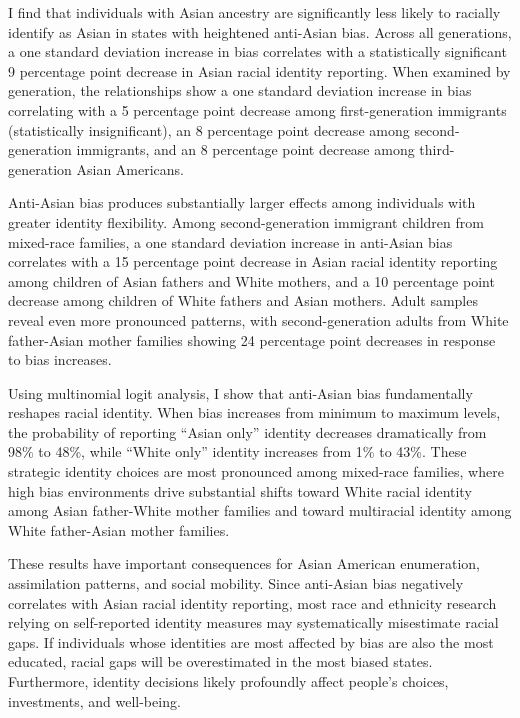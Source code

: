 I find that individuals with Asian ancestry are significantly less likely to racially identify as Asian in states with heightened anti-Asian bias. Across all generations, a one standard deviation increase in bias correlates with a statistically significant 9 percentage point decrease in Asian racial identity reporting. When examined by generation, the relationships show a one standard deviation increase in bias correlating with a 5 percentage point decrease among first-generation immigrants (statistically insignificant), an 8 percentage point decrease among second-generation immigrants, and an 8 percentage point decrease among third-generation Asian Americans.

Anti-Asian bias produces substantially larger effects among individuals with greater identity flexibility. Among second-generation immigrant children from mixed-race families, a one standard deviation increase in anti-Asian bias correlates with a 15 percentage point decrease in Asian racial identity reporting among children of Asian fathers and White mothers, and a 10 percentage point decrease among children of White fathers and Asian mothers. Adult samples reveal even more pronounced patterns, with second-generation adults from White father-Asian mother families showing 24 percentage point decreases in response to bias increases.

Using multinomial logit analysis, I show that anti-Asian bias fundamentally reshapes racial identity. When bias increases from minimum to maximum levels, the probability of reporting ``Asian only'' identity decreases dramatically from 98\% to 48\%, while ``White only'' identity increases from 1\% to 43\%. These strategic identity choices are most pronounced among mixed-race families, where high bias environments drive substantial shifts toward White racial identity among Asian father-White mother families and toward multiracial identity among White father-Asian mother families.

These results have important consequences for Asian American enumeration, assimilation patterns, and social mobility. Since anti-Asian bias negatively correlates with Asian racial identity reporting, most race and ethnicity research relying on self-reported identity measures may systematically misestimate racial gaps. If individuals whose identities are most affected by bias are also the most educated, racial gaps will be overestimated in the most biased states. Furthermore, identity decisions likely profoundly affect people's choices, investments, and well-being.

